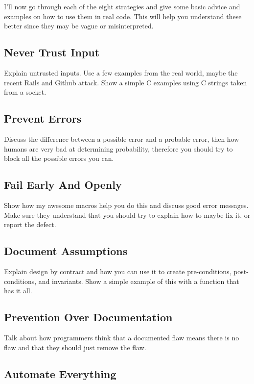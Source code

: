 I'll now go through each of the eight strategies and give some basic advice and examples on how to use them in real code.
This will help you understand these better since they may be vague or misinterpreted.


\subsection{Never Trust Input}

Explain untrusted inputs. Use a few examples from the real world, maybe the recent Rails and Github attack.
Show a simple C examples using C strings taken from a socket.

\subsection{Prevent Errors}

Discuss the difference between a possible error and a probable error, then how humans are very bad
at determining probability, therefore you should try to block all the possible errors you can.


\subsection{Fail Early And Openly}

Show how my awesome macros help you do this and discuss good error messages.  Make sure they understand
that you should try to explain how to maybe fix it, or report the defect.

\subsection{Document Assumptions}

Explain design by contract and how you can use it to create pre-conditions, post-conditions, and 
invariants.  Show a simple example of this with a function that has it all.

\subsection{Prevention Over Documentation}

Talk about how programmers think that a documented flaw means there is no flaw and that they
should just remove the flaw.

\subsection{Automate Everything}

